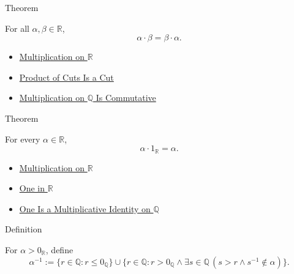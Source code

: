 \begin{theorembox}{Theorem}
\begin{theorem}
\label{thm:multiplication-on-r-commutative}
For all $\alpha,\beta\in\mathbb{R}$,
\[
\alpha\cdot\beta=\beta\cdot\alpha.
\]
\end{theorem}
\end{theorembox}

\begin{dependencies}
\begin{itemize}
  \item \hyperref[def:multiplication-on-r]{Multiplication on $\mathbb{R}$}
  \item \hyperref[lem:product-of-cuts-is-a-cut]{Product of Cuts Is a Cut}
  \item \hyperref[thm:multiplication-on-q-commutative]{Multiplication on $\mathbb{Q}$ Is Commutative}
\end{itemize}
\end{dependencies}

\begin{theorembox}{Theorem}
\begin{theorem}
\label{thm:one-multiplicative-identity-on-r}
For every $\alpha\in\mathbb{R}$,
\[
\alpha\cdot 1_{\mathbb{R}}=\alpha.
\]
\end{theorem}
\end{theorembox}

\begin{dependencies}
\begin{itemize}
  \item \hyperref[def:multiplication-on-r]{Multiplication on $\mathbb{R}$}
  \item \hyperref[def:one-in-r]{One in $\mathbb{R}$}
  \item \hyperref[thm:one-multiplicative-identity-on-q]{One Is a Multiplicative Identity on $\mathbb{Q}$}
\end{itemize}
\end{dependencies}

\begin{definitionbox}{Definition}
\begin{definition}
\label{def:reciprocal-positive-on-r}
For $\alpha>0_{\mathbb{R}}$, define
\[
\alpha^{-1}:=\{r\in\mathbb{Q}:r\le 0_{\mathbb{Q}}\}
\cup
\{r\in\mathbb{Q}:r>0_{\mathbb{Q}}\land \exists s\in\mathbb{Q}\,(s>r\land s^{-1}\notin\alpha)\}.
\]
\end{definition}
\end{definitionbox}

